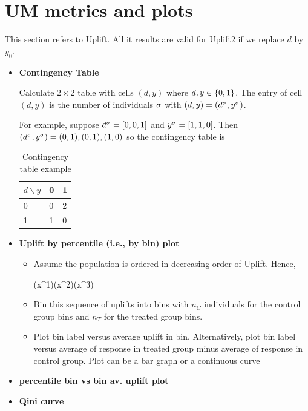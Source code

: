 \section{UM metrics and plots}
This section refers to Uplift.
All it results are valid for 
Uplift2 if we replace $d$ by $y_0$.





\begin{itemize}
\item {\bf Contingency Table}

Calculate $2\times 2$ table with cells $(d, y)$
where $d, y\in\{0,1\}$. The entry of cell
$(d,y)$ is the number of individuals $\sigma$
with $(d,y)=(d^\sigma, y^\sigma)$.

For example, suppose $d^\sigma=[0,0,1]$
and $y^\sigma=[1,1,0]$. Then $(d^\sigma,y^\sigma)= (0,1), (0,1), (1,0)$
so the contingency table is

\begin{table}[h!]
\begin{tabular}{|l|l|l|}
\hline
$d \backslash y$ & \cellcolor[HTML]{FFFFC7}0 & \cellcolor[HTML]{FFFFC7}1 \\ \hline
\cellcolor[HTML]{FFFFC7}0 & 0 & 2 \\ \hline
\cellcolor[HTML]{FFFFC7}1 & 1 & 0 \\ \hline
\end{tabular}
\caption{Contingency table example}
\label{tab-con-tab}
\end{table}

\item {\bf Uplift by percentile (i.e., by bin) plot}

\begin{itemize}[\checkmark]
\item Assume the population is ordered in decreasing 
order of Uplift. Hence,

\beq \delta(x^1)\geq \delta(x^2)\geq \delta(x^3)\geq \cdots
\eeq
\item Bin this sequence of uplifts into bins with $n_C$ individuals
for the control group bins 
and $n_T$ for the treated group bins.
\item Plot bin label versus average uplift in bin.
Alternatively, plot bin label versus average of response
in treated group minus average of response in control group.
Plot can be a bar graph or a continuous curve

\end{itemize}

\item {\bf percentile bin vs bin av. uplift plot}
\item {\bf Qini curve}


\end{itemize}
